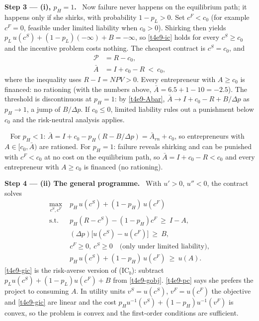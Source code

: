 \documentclass[11pt,a4paper]{article}
\newcommand{\step}[2]{\par\medskip\noindent\textbf{Step #1 --- #2.}~}
\newcommand{\answer}[1]{\par\smallskip\noindent\fbox{\textbf{Answer #1.}}~}
\begin{document}
\step{3}{(i), $p_H=1$} Now failure never happens on the equilibrium path; it happens only if she
shirks, with probability $1-p_L>0$. Set $c^F<c_0$ (for example $c^F=0$, feasible under limited
liability when $c_0>0$). Shirking then yields $p_L\,u(c^S)+(1-p_L)(-\infty)+B=-\infty$, so
\eqref{t4e9-ic} holds for every $c^S\ge c_0$ and the incentive problem costs nothing. The cheapest
contract is $c^S=c_0$, and
\begin{align}
  \mathcal{P} &= R-c_0, \label{t4e9-P1}\\
  \bar A &= I+c_0-R\ <\ c_0, \label{t4e9-Abar1}
\end{align}
where the inequality uses $R-I=\mathit{NPV}>0$. Every entrepreneur with $A\ge c_0$ is financed: no
rationing (with the numbers above, $\bar A=6.5+1-10=-2.5$). The threshold is discontinuous at
$p_H=1$: by \eqref{t4e9-Abar}, $\bar A\to I+c_0-R+B/\Delta p$ as $p_H\to1$, a jump of $B/\Delta p$.
If $c_0\le0$, limited liability rules out a punishment below $c_0$ and the risk-neutral analysis applies.

\answer{(i)} For $p_H<1$: $\bar A=I+c_0-p_H(R-B/\Delta p)=\bar A_{rn}+c_0$, so entrepreneurs with
$A\in[c_0,\bar A)$ are rationed. For $p_H=1$: failure reveals shirking and can be punished with
$c^F<c_0$ at no cost on the equilibrium path, so $\bar A=I+c_0-R<c_0$ and every entrepreneur with
$A\ge c_0$ is financed (no rationing).

\step{4}{(ii) The general programme} With $u'>0$, $u''<0$, the contract solves
\begin{align}
  \max_{c^S,c^F}\; & p_H\,u(c^S)+(1-p_H)\,u(c^F) \label{t4e9-gobj}\\
  \text{s.t. }\; & p_H(R-c^S)-(1-p_H)c^F\ \ge\ I-A, \tag{IR$_l$}\label{t4e9-girl}\\
  & (\Delta p)\big[u(c^S)-u(c^F)\big]\ \ge\ B, \tag{IC$_b$}\label{t4e9-gic}\\
  & c^F\ge 0,\ c^S\ge0 \quad\text{(only under limited liability)}, \tag{LL}\label{t4e9-ll}\\
  & p_H\,u(c^S)+(1-p_H)\,u(c^F)\ \ge\ u(A). \tag{PC}\label{t4e9-pc}
\end{align}
\eqref{t4e9-gic} is the risk-averse version of (IC$_b$): subtract $p_Lu(c^S)+(1-p_L)u(c^F)+B$
from \eqref{t4e9-gobj}. \eqref{t4e9-pc} says she prefers the project to consuming $A$. In utility
units $v^S=u(c^S)$, $v^F=u(c^F)$ the objective and \eqref{t4e9-gic} are linear and the cost
$p_Hu^{-1}(v^S)+(1-p_H)u^{-1}(v^F)$ is convex, so the problem is convex and the first-order
conditions are sufficient.
\end{document}
